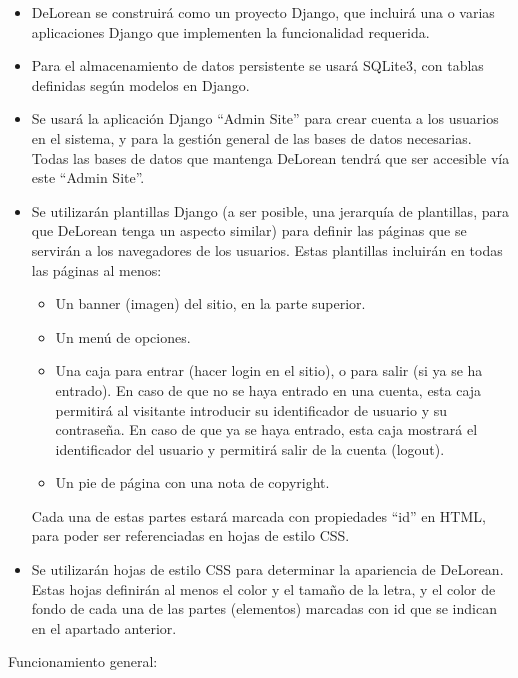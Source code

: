 \begin{itemize}

\item DeLorean se construirá como un proyecto Django, que incluirá una o varias aplicaciones Django que implementen la funcionalidad requerida.

\item Para el almacenamiento de datos persistente se usará SQLite3, con tablas definidas según modelos en Django.

\item Se usará la aplicación Django ``Admin Site'' para crear cuenta a los usuarios en el sistema, y para la gestión general de las bases de datos necesarias. Todas las bases de datos que mantenga DeLorean tendrá que ser accesible vía este ``Admin Site''.

\item Se utilizarán plantillas Django (a ser posible, una jerarquía de plantillas, para que DeLorean tenga un aspecto similar) para definir las páginas que se servirán a los navegadores de los usuarios. Estas plantillas incluirán en todas las páginas al menos:
  \begin{itemize}
  \item Un banner (imagen) del sitio, en la parte superior.
  \item Un menú de opciones.
  \item Una caja para entrar (hacer login en el sitio), o para salir (si ya se ha entrado). En caso de que no se haya entrado en una cuenta, esta caja permitirá al visitante introducir su identificador de usuario y su contraseña. En caso de que ya se haya entrado, esta caja mostrará el identificador del usuario y permitirá salir de la cuenta (logout).
  \item Un pie de página con una nota de copyright.
  \end{itemize}

Cada una de estas partes estará marcada con propiedades ``id'' en HTML, para poder ser referenciadas en hojas de estilo CSS.

\item Se utilizarán hojas de estilo CSS para determinar la apariencia de DeLorean. Estas hojas definirán al menos el color y el tamaño de la letra, y el color de fondo de cada una de las partes (elementos) marcadas con id que se indican en el apartado anterior.
\end{itemize}

Funcionamiento general:

